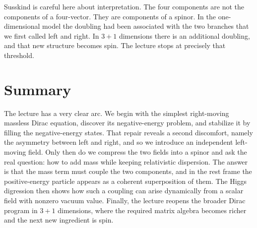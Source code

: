 Susskind is careful here about interpretation. The four components are not the components of a four-vector. They are components of a spinor. In the one-dimensional model the doubling had been associated with the two branches that we first called left and right. In \(3+1\) dimensions there is an additional doubling, and that new structure becomes spin. The lecture stops at precisely that threshold.

\section{Summary}

The lecture has a very clear arc. We begin with the simplest right-moving massless Dirac equation, discover its negative-energy problem, and stabilize it by filling the negative-energy states. That repair reveals a second discomfort, namely the asymmetry between left and right, and so we introduce an independent left-moving field. Only then do we compress the two fields into a spinor and ask the real question: how to add mass while keeping relativistic dispersion. The answer is that the mass term must couple the two components, and in the rest frame the positive-energy particle appears as a coherent superposition of them. The Higgs digression then shows how such a coupling can arise dynamically from a scalar field with nonzero vacuum value. Finally, the lecture reopens the broader Dirac program in \(3+1\) dimensions, where the required matrix algebra becomes richer and the next new ingredient is spin.